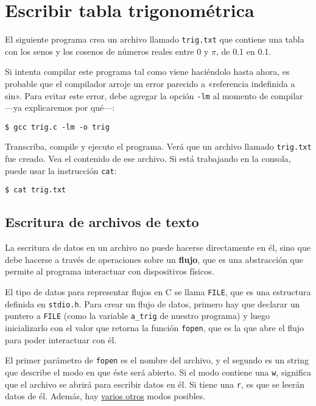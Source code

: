 \section{Escribir tabla trigonométrica}

El siguiente programa crea un archivo llamado \lstinline!trig.txt! que
contiene una tabla con los senos y los cosenos de números reales entre 0
y \(\pi\), de 0.1 en 0.1.

Si intenta compilar este programa tal como viene haciéndolo hasta ahora,
es probable que el compilador arroje un error parecido a «referencia
indefinida a sin». Para evitar este error, debe agregar la opción
\lstinline!-lm! al momento de compilar ---ya explicaremos por qué---:

\begin{lstlisting}
$ gcc trig.c -lm -o trig
\end{lstlisting}

Transcriba, compile y ejecute el programa. Verá que un archivo llamado
\lstinline!trig.txt! fue creado. Vea el contenido de ese archivo. Si
está trabajando en la consola, puede usar la instrucción
\lstinline!cat!:

\begin{lstlisting}
$ cat trig.txt
\end{lstlisting}

\subsection{Escritura de archivos de texto}

La escritura de datos en un archivo no puede hacerse directamente en él,
sino que debe hacerse a través de operaciones sobre un \textbf{flujo},
que es una abstracción que permite al programa interactuar con
dispositivos físicos.

El tipo de datos para representar flujos en C se llama \lstinline!FILE!,
que es una estructura definida en \lstinline!stdio.h!. Para crear un
flujo de datos, primero hay que declarar un puntero a \lstinline!FILE!
(como la variable \lstinline!a_trig! de nuestro programa) y luego
inicializarlo con el valor que retorna la función \lstinline!fopen!, que
es la que abre el flujo para poder interactuar con él.

El primer parámetro de \lstinline!fopen! es el nombre del archivo, y el
segundo es un string que describe el modo en que éste será abierto. Si
el modo contiene una \lstinline!w!, significa que el archivo se abrirá
para escribir datos en él. Si tiene una \lstinline!r!, es que se leerán
datos de él. Además, hay
\href{http://c.conclase.net/librerias/?ansifun=fopen}{varios otros}
modos posibles.

